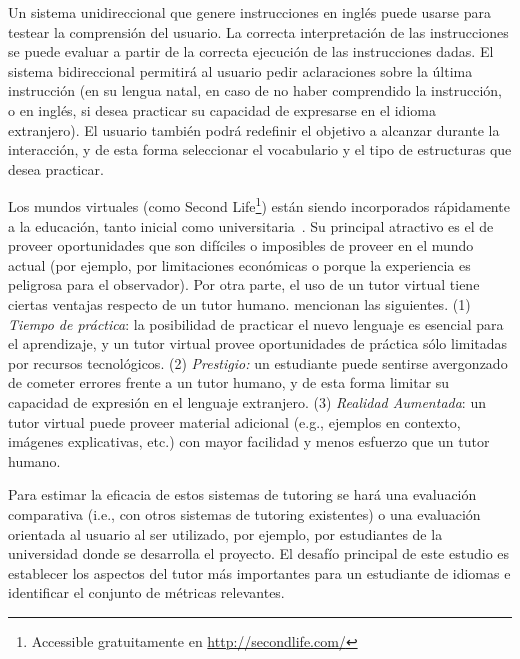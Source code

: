 Un sistema unidireccional que genere instrucciones en ingl\'es puede
usarse para testear la comprensi\'on del usuario.  La correcta
interpretaci\'on de las instrucciones se puede evaluar a partir de la
correcta ejecuci\'on de las instrucciones dadas.  El sistema
bidireccional permitir\'a al usuario pedir aclaraciones sobre la
\'ultima instrucci\'on (en su lengua natal, en caso de no haber comprendido
la instrucci\'on, o en ingl\'es, si desea practicar su
capacidad de expresarse en el idioma extranjero).  El usuario tambi\'en
podr\'a redefinir el objetivo a alcanzar durante la interacci\'on, y
de esta forma seleccionar el vocabulario y el tipo de estructuras que desea
practicar.

Los mundos virtuales (como Second Life\footnote{Accessible gratuitamente
en \url{http://secondlife.com/}}) est\'an siendo incorporados r\'apidamente a
la educaci\'on, tanto inicial como universitaria~\cite{Doswell05,molk:lear09}. 
Su principal atractivo
es el de proveer oportunidades que son dif\'iciles o imposibles de
proveer en el mundo actual (por ejemplo, por limitaciones econ\'omicas
o porque la experiencia es peligrosa para el observador).
Por otra parte, el uso de un tutor virtual tiene ciertas ventajas
respecto de un tutor humano. \cite{engwall1020} mencionan las siguientes. (1) \emph{Tiempo de
pr\'actica}: la posibilidad de practicar el nuevo lenguaje es esencial
para el aprendizaje, y un tutor virtual provee oportunidades de pr\'actica
s\'olo limitadas por recursos tecnol\'ogicos. (2) \emph{Prestigio:} un
estudiante puede sentirse avergonzado de cometer errores frente a un tutor
humano, y de esta forma limitar su capacidad de expresi\'on en el lenguaje
extranjero. (3) \emph{Realidad Aumentada}: un tutor virtual puede proveer
material adicional (e.g., ejemplos en contexto, im\'agenes explicativas, etc.) con mayor facilidad y menos esfuerzo que un tutor humano.

Para estimar la eficacia de estos sistemas de tutoring se har\'a una
evaluaci\'on comparativa (i.e., con otros
sistemas de tutoring existentes) o una evaluaci\'on orientada al usuario al ser
utilizado, por ejemplo, por estudiantes de la universidad donde se desarrolla el
proyecto.
El desaf\'io principal de este
estudio es establecer los aspectos del tutor m\'as importantes para un
estudiante de idiomas e identificar el conjunto de m\'etricas relevantes.












